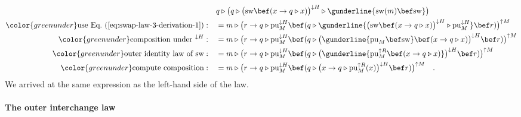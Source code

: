\begin{align*}
 & q\triangleright\big(q\triangleright\big(\text{sw}\bef(x\rightarrow q\triangleright x)\big)^{\downarrow H}\triangleright\gunderline{\text{sw}(m)\bef\text{sw}}\big)\\
{\color{greenunder}\text{use Eq.~(\ref{eq:swap-law-3-derivation-1})}:}\quad & =m\triangleright\big(r\rightarrow q\triangleright\text{pu}_{M}^{\downarrow H}\bef(q\triangleright\gunderline{\big(\text{sw}\bef(x\rightarrow q\triangleright x)\big)^{\downarrow H}\triangleright\text{pu}_{M}^{\downarrow H}}\bef r)\big)^{\uparrow M}\\
{\color{greenunder}\text{composition under }^{\downarrow H}:}\quad & =m\triangleright\big(r\rightarrow q\triangleright\text{pu}_{M}^{\downarrow H}\bef(q\triangleright\big(\gunderline{\text{pu}_{M}\bef\text{sw}}\bef(x\rightarrow q\triangleright x)\big)^{\downarrow H}\bef r)\big)^{\uparrow M}\\
{\color{greenunder}\text{outer identity law of }\text{sw}:}\quad & =m\triangleright\big(r\rightarrow q\triangleright\text{pu}_{M}^{\downarrow H}\bef(q\triangleright\big(\gunderline{\text{pu}_{M}^{\uparrow R}\bef(x\rightarrow q\triangleright x)}\big)^{\downarrow H}\bef r)\big)^{\uparrow M}\\
{\color{greenunder}\text{compute composition}:}\quad & =m\triangleright\big(r\rightarrow q\triangleright\text{pu}_{M}^{\downarrow H}\bef(q\triangleright\big(x\rightarrow q\triangleright\text{pu}_{M}^{\uparrow R}(x)\big)^{\downarrow H}\bef r)\big)^{\uparrow M}\quad.
\end{align*}
We arrived at the same expression as the left-hand side of the law.

\paragraph{The outer interchange law}

